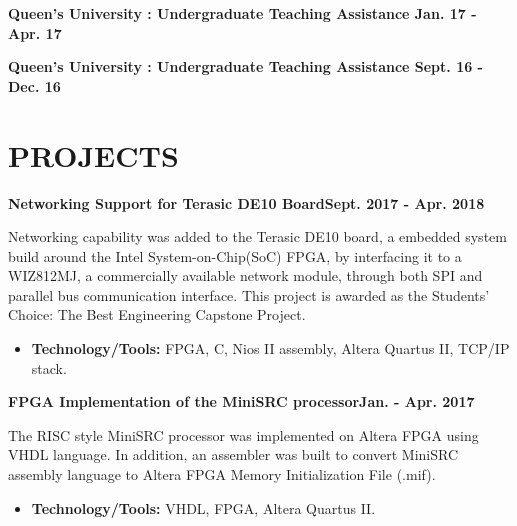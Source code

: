\documentclass[margin]{res}
\begin{document}
\begin{resume}
\textbf{Queen's University : Undergraduate Teaching Assistance \hfill{Jan. 17 - Apr. 17}\\}

\textbf{Queen's University : Undergraduate Teaching Assistance \hfill{Sept. 16 - Dec. 16}\\}

\section{PROJECTS}
\textbf{Networking Support for Terasic DE10 Board\hfill Sept. 2017 - Apr. 2018}

Networking capability was added to the Terasic DE10 board, a embedded system build around the Intel System-on-Chip(SoC) FPGA, by interfacing it to a WIZ812MJ, a commercially available network module, through both SPI and parallel bus communication interface.
This project is awarded as the Students' Choice: The Best Engineering Capstone Project.
\begin{itemize}
\item \textbf{Technology/Tools:} FPGA, C, Nios II assembly, Altera Quartus II, TCP/IP stack.
\end{itemize}

\textbf{FPGA Implementation of the MiniSRC processor\hfill Jan. - Apr. 2017}

The RISC style MiniSRC processor was implemented on Altera FPGA using VHDL language. In addition, an assembler was built to convert MiniSRC assembly language to Altera FPGA Memory Initialization File (.mif).
\begin{itemize}
\item \textbf{Technology/Tools:} VHDL, FPGA, Altera Quartus II.
\end{itemize}


\end{resume}
\end{document}

